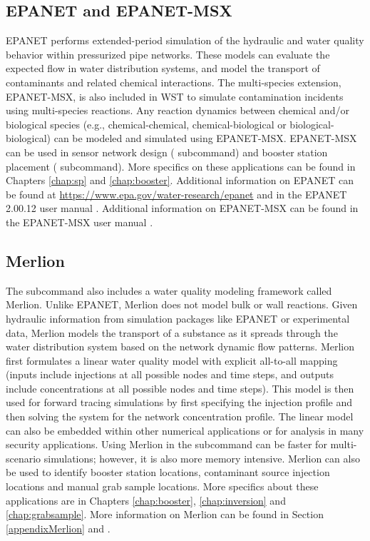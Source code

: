 \subsection{EPANET and EPANET-MSX}\label{epanet}
EPANET performs extended-period simulation of the hydraulic and water quality 
behavior within pressurized pipe networks. These models can evaluate the 
expected flow in water distribution systems, and model the transport of 
contaminants and related chemical interactions. The multi-species extension, 
EPANET-MSX, is also included in WST to simulate contamination incidents 
using multi-species reactions. Any reaction dynamics between chemical and/or 
biological species (e.g., chemical-chemical, chemical-biological or
biological-biological) can be modeled and simulated using EPANET-MSX. 
EPANET-MSX can be used in sensor network design ( subcommand) and 
booster station placement ( subcommand). More specifics 
on these applications can be found in Chapters \ref{chap:sp} and \ref{chap:booster}. 
Additional information on EPANET can be found at 
\url{https://www.epa.gov/water-research/epanet}
and in the EPANET 2.00.12 user manual \citep{EPANETusermanual}. Additional information 
on EPANET-MSX can be found in the EPANET-MSX user manual \citep{ShaUbeRos11}.

\subsection{Merlion}\label{merlion}
The  subcommand also includes a water quality modeling framework
called Merlion. Unlike EPANET, Merlion does not model bulk or wall
reactions. Given hydraulic information from simulation packages like
EPANET or experimental data, Merlion models the transport of a substance
as it spreads through the water distribution system based on the network
dynamic flow patterns. Merlion first formulates a linear water quality model 
with explicit all-to-all mapping (inputs include injections at all possible nodes 
and time steps, and outputs include concentrations at all possible nodes and 
time steps). This model is then used for forward
tracing simulations by first specifying the injection profile and
then solving the system for the network concentration profile. The linear model 
can also be embedded within other numerical
applications or for analysis in many security applications. Using Merlion in the   
 subcommand can be faster for multi-scenario simulations; however,
it is also more memory intensive. Merlion can also be used to  
identify booster station locations, contaminant source injection locations 
and manual grab sample locations. More specifics about these applications are in Chapters 
\ref{chap:booster}, \ref{chap:inversion} and \ref{chap:grabsample}. 
More information on Merlion can be found in Section \ref{appendixMerlion} and \citet{Merlion12}.

